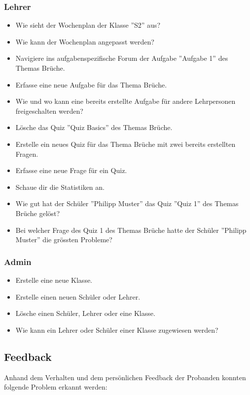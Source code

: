 \subsubsection*{Lehrer}
\begin{itemize}
	\item Wie sieht der Wochenplan der Klasse ''S2'' aus?
	\item Wie kann der Wochenplan angepasst werden?
	\item Navigiere ins aufgabenspezifische Forum der Aufgabe ''Aufgabe 1'' des Themas Brüche.
	\item Erfasse eine neue Aufgabe für das Thema Brüche.
	\item Wie und wo kann eine bereits erstellte Aufgabe für andere Lehrpersonen freigeschalten werden?
	\item Lösche das Quiz ''Quiz Basics'' des Themas Brüche.
	\item Erstelle ein neues Quiz für das Thema Brüche mit zwei bereits erstellten Fragen.
	\item Erfasse eine neue Frage für ein Quiz.
	\item Schaue dir die Statistiken an.
	\item Wie gut hat der Schüler ''Philipp Muster'' das Quiz ''Quiz 1'' des Themas Brüche gelöst?
	\item Bei welcher Frage des Quiz 1 des Themas Brüche hatte der Schüler ''Philipp Muster'' die grössten Probleme?
\end{itemize}


\subsubsection*{Admin}
\begin{itemize}
	\item Erstelle eine neue Klasse.
	\item Erstelle einen neuen Schüler oder Lehrer.
	\item Lösche einen Schüler, Lehrer oder eine Klasse.
	\item Wie kann ein Lehrer oder Schüler einer Klasse zugewiesen werden?
\end{itemize} 

\subsection*{Feedback}
Anhand dem Verhalten und dem persönlichen Feedback der Probanden konnten folgende Problem erkannt werden:

